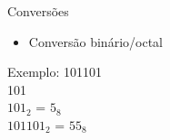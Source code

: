 

\begin{frame}{Conversões}
    \begin{itemize}
        \item Conversão binário/octal
    \end{itemize}
    Exemplo: 101101 \\[0.2cm]
     101 \\[0.2cm]
    $101_{2}$ = $5_{8}$ \\[0.2cm]
    $101101_{2}$ = $55_{8}$
\end{frame}